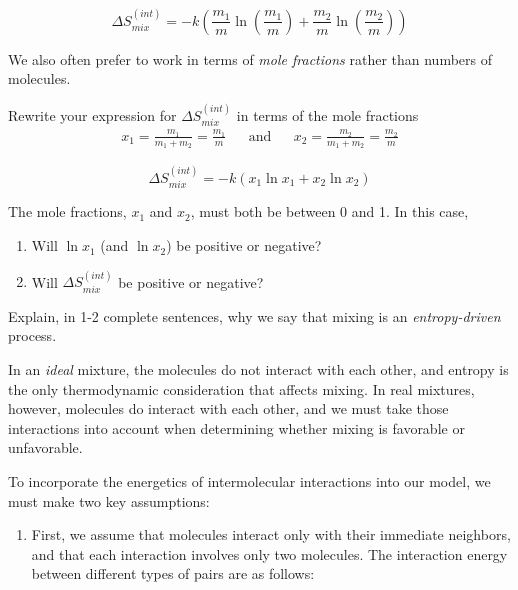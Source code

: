 \begin{activity}
\begin{ctqs}
			\begin{solution}[1in]
			
				\begin{equation*}
					\Delta S_{mix}^{(int)} = -k\left(\frac{m_1}{m} \ln\left(\frac{m_1}{m}\right) + \frac{m_2}{m} \ln\left(\frac{m_2}{m}\right) \right)
				\end{equation*}
			\end{solution}
		
	\question We also often prefer to work in terms of \emph{mole fractions} rather than numbers of molecules. \label{ctq:Smixed}
	
		Rewrite your expression for $\Delta S_{mix}^{(int)}$ in terms of the mole fractions
		\begin{align*}
			x_1 = \frac{m_1}{m_1 + m_2} = \frac{m_1}{m} && \text{and} && x_2 = \frac{m_2}{m_1+m_2} = \frac{m_2}{m}
		\end{align*}
		
			\begin{solution}[1in]
			
				\begin{equation*}
					\Delta S_{mix}^{(int)} = -k\left(x_1 \ln x_1 + x_2 \ln x_2 \right)
				\end{equation*}
			\end{solution}
		
	\question The mole fractions, $x_1$ and $x_2$, must both be between 0 and 1.  In this case,
		\begin{enumerate}
			\item Will $\ln x_1$ (and $\ln x_2$) be positive or negative?
			\item Will $\Delta S_{mix}^{(int)}$ be positive or negative? \label{ctq:Spositive}
		\end{enumerate}
		
	\question Explain, in 1-2 complete sentences, why we say that mixing is an \emph{entropy-driven} process.
\end{ctqs}
	

\begin{model}

In an \emph{ideal} mixture, the molecules do not interact with each other, and entropy is the only thermodynamic consideration that affects mixing.
In real mixtures, however, molecules do interact with each other, and we must take those interactions into account when determining whether mixing is favorable or unfavorable.

To incorporate the energetics of intermolecular interactions into our model, we must make two key assumptions:
\begin{enumerate}
	\item First, we assume that molecules interact only with their immediate neighbors, and that each interaction involves only two molecules.  The interaction energy between different types of pairs are as follows:
	

\end{enumerate}
\end{model}
\end{activity}
